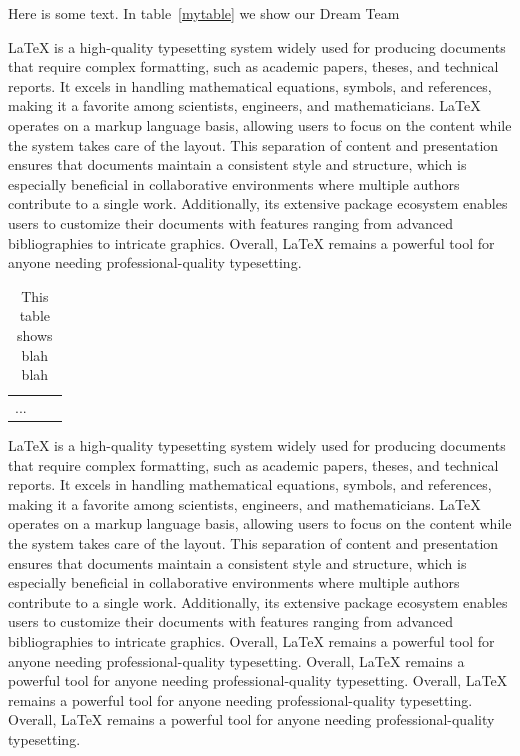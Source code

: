 \documentclass[11pt]{article}
\begin{document}
Here is some text. In table~\ref{mytable}
we show our Dream Team

LaTeX is a high-quality typesetting system widely used for producing documents that require complex formatting, such as academic papers, theses, and technical reports. It excels in handling mathematical equations, symbols, and references, making it a favorite among scientists, engineers, and mathematicians. LaTeX operates on a markup language basis, allowing users to focus on the content while the system takes care of the layout. This separation of content and presentation ensures that documents maintain a consistent style and structure, which is especially beneficial in collaborative environments where multiple authors contribute to a single work. Additionally, its extensive package ecosystem enables users to customize their documents with features ranging from advanced bibliographies to intricate graphics. Overall, LaTeX remains a powerful tool for anyone needing professional-quality typesetting.

\begin{table}[t]
\begin{center}
\begin{tabular}{|c||l|p{1in}|}
...
\end{tabular}
\end{center}
\caption{ \label{firsttable}
This table shows blah blah}
\end{table}

LaTeX is a high-quality typesetting system widely used for producing documents that require complex formatting, such as academic papers, theses, and technical reports. It excels in handling mathematical equations, symbols, and references, making it a favorite among scientists, engineers, and mathematicians. LaTeX operates on a markup language basis, allowing users to focus on the content while the system takes care of the layout. This separation of content and presentation ensures that documents maintain a consistent style and structure, which is especially beneficial in collaborative environments where multiple authors contribute to a single work. Additionally, its extensive package ecosystem enables users to customize their documents with features ranging from advanced bibliographies to intricate graphics. Overall, LaTeX remains a powerful tool for anyone needing professional-quality typesetting. Overall, LaTeX remains a powerful tool for anyone needing professional-quality typesetting. Overall, LaTeX remains a powerful tool for anyone needing professional-quality typesetting.  Overall, LaTeX remains a powerful tool for anyone needing professional-quality typesetting.
\end{document}
